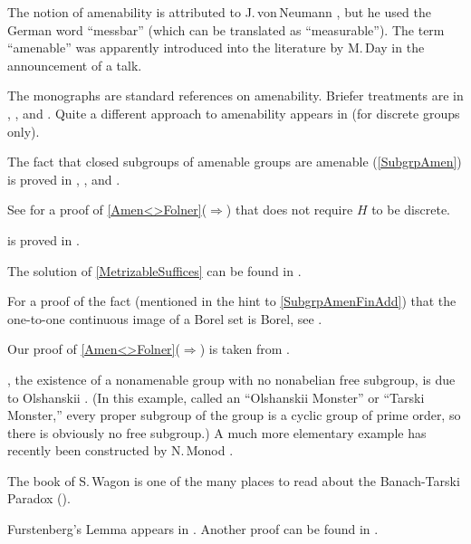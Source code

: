 \begin{notes}

The notion of amenability is attributed to J.\,von\,Neumann \cite{vonNeumann-AllgemeineMasses}, but he used the German word ``messbar'' (which can be translated as ``measurable''). The term ``amenable'' was apparently introduced into the literature by M.\,Day \cite[\#507, p.~1054]{Day-MeansAbstract} in the announcement of a talk.

The monographs \cite{PatersonBook,PierBook} are standard references on amenability.
Briefer treatments are in \cite[App.~G]{BekkaHarpeValette-T}, \cite{GreenleafBook}, and \cite[\S4.1]{ZimmerBook}.
Quite a different approach to amenability appears in \cite[Chaps.~10--12]{WagonBook} (for discrete groups only).

The fact that closed subgroups of amenable groups are amenable (\cref{SubgrpAmen}) is proved in \cite[Thm.~2.3.2, pp.~30--32]{GreenleafBook}, \cite[Prop.~13.3, p.~118]{PierBook}, and \cite[Prop.~4.2.20, p.~74]{ZimmerBook}.

See \cite[p.~67]{GreenleafBook} for a proof of \cref{Amen<>Folner}($\Rightarrow$) that does not require $H$ to be discrete.

 is proved in \cite[pp.~46--47]{GreenleafBook}.

The solution of \cref{MetrizableSuffices} can be found in \cite[Thm.~5.4, p.~45]{PierBook}.

For a proof of the fact (mentioned in the hint to \cref{SubgrpAmenFinAdd}) that the one-to-one continuous image of a Borel set is Borel, see \cite[Thm.~3.3.2, p.~70]{Arveson-Cstar}.

Our proof of \cref{Amen<>Folner}($\Rightarrow$) is taken from \cite[pp.~66-67]{GreenleafBook}.

, the existence of a nonamenable group with no nonabelian free subgroup, is due to Olshanskii \cite{Olshanskii-ExInvMean}. (In this example, called an ``Olshanskii Monster'' or ``Tarski Monster\zz,'' every proper subgroup of the group is a cyclic group of prime order, so there is obviously no free subgroup.) A much more elementary example has recently been constructed by N.\,Monod \cite{Monod-PiecewiseProj}.

The book of S.\,Wagon \cite{WagonBook} is one of the many places to read about the Banach-Tarski Paradox ().

Furstenberg's Lemma  appears in \cite[Thm.~15.1]{Furstenberg-BdThyStochProc}. Another proof can be found in \cite[Prop.~4.3.9, p.~81]{ZimmerBook}. 


\end{notes}
